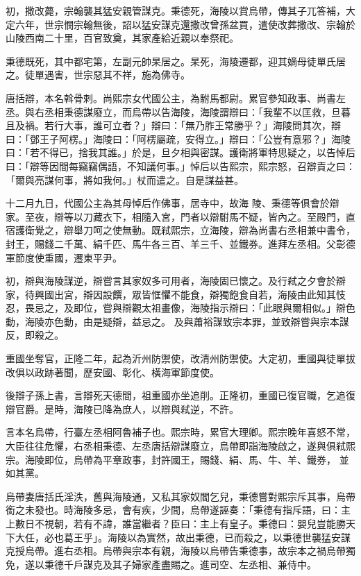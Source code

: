 \begin{pinyinscope}
 初，撒改薨，宗翰襲其猛安親管謀克。秉德死，海陵以賞烏帶，傳其子兀答補，大定六年，世宗憫宗翰無後，詔以猛安謀克還撒改曾孫盆買，遣使改葬撒改、宗翰於山陵西南二十里，百官致奠，其家產給近親以奉祭祀。



 秉德既死，其中都宅第，左副元帥杲居之。杲死，海陵遷都，迎其嫡母徒單氏居之。徒單遇害，世宗惡其不祥，施為佛寺。



 唐括辯，本名斡骨剌。尚熙宗女代國公主，為駙馬都尉。累官參知政事、尚書左丞。與右丞相秉德謀廢立，而烏帶以告海陵，海陵謂辯曰：「我輩不以匡救，旦暮且及禍。若行大事，誰可立者？」辯曰：「無乃胙王常勝乎？」海陵問其次，辯曰：「鄧王子阿楞。」海陵曰：「阿楞屬疏，安得立。」辯曰：「公豈有意邪？」海陵曰：「若不得已，捨我其誰。」於是，旦夕相與密謀。護衛將軍特思疑之，以告悼后曰：「辯等因間每竊竊偶語，不知議何事。」悼后以告熙宗，熙宗怒，召辯責之曰：「爾與亮謀何事，將如我何。」杖而遣之。自是謀益甚。



 十二月九日，代國公主為其母悼后作佛事，居寺中，故海
 陵、秉德等俱會於辯家。至夜，辯等以刀藏衣下，相隨入宮，門者以辯駙馬不疑，皆內之。至殿門，直宿護衛覺之，辯舉刀呵之使無動。既弒熙宗，立海陵，辯為尚書右丞相兼中書令，封王，賜錢二千萬、絹千匹、馬牛各三百、羊三千、並鐵券。進拜左丞相。父彰德軍節度使重國，遷東平尹。



 初，辯與海陵謀逆，辯嘗言其家奴多可用者，海陵固已懷之。及行弒之夕會於辯家，待興國出宮，辯因設饌，眾皆恇懼不能食，辯獨飽食自若，海陵由此知其忮忍，畏忌之，及即位，嘗與辯觀太祖畫像，海陵指示辯曰：「此眼與爾相似。」辯色動，海陵亦色動，由是疑辯，益忌之。
 及與蕭裕謀致宗本罪，並致辯嘗與宗本謀反，即殺之。



 重國坐奪官，正隆二年，起為沂州防禦使，改清州防禦使。大定初，重國與徒單拔改俱以政跡著聞，歷安國、彰化、橫海軍節度使。



 後辯子孫上書，言辯死天德間，祖重國亦坐追削。正隆初，重國已復官職，乞追復辯官爵。是時，海陵已降為庶人，以辯與弒逆，不許。



 言本名烏帶，行臺左丞相阿魯補子也。熙宗時，累官大理卿。熙宗晚年喜怒不常，大臣往往危懼，右丞相秉德、左丞唐括辯謀廢立，烏帶即詣海陵啟之，遂與俱弒熙宗。海陵即位，烏帶為平章政事，封許國王，賜錢、絹、馬、牛、羊、鐵券，
 並如其黨。



 烏帶妻唐括氏淫泆，舊與海陵通，又私其家奴閻乞兒，秉德嘗對熙宗斥其事，烏帶銜之未發也。時海陵多忌，會有疾，少間，烏帶遂誣奏：「秉德有指斥語，曰：主上數日不視朝，若有不諱，誰當繼者？臣曰：主上有皇子。秉德曰：嬰兒豈能勝天下大任，必也葛王乎」。海陵以為實然，故出秉德，已而殺之，以秉德世襲猛安謀克授烏帶。進右丞相。烏帶與宗本有親，海陵以烏帶告秉德事，故宗本之禍烏帶獨免，遂以秉德千戶謀克及其子婦家產盡賜之。進司空、左丞相、兼侍中。




\end{pinyinscope}
